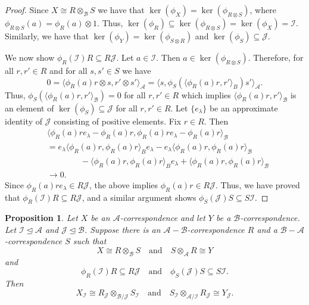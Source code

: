\documentclass[11pt, letterpaper,final]{amsart}
\newcommand{\A}{{\mathcal{A}}}
\newcommand{\B}{{\mathcal{B}}}
\newcommand{\I}{{\mathcal{I}}}
\newcommand{\J}{{\mathcal{J}}}
\newtheorem{prp}[thm]{Proposition}
\theoremstyle{definition}
\begin{document}
\begin{proof}
Since $X \cong R \otimes_{\B} S$ we have that $\ker(\phi_X) = \ker(\phi_{R \otimes S} )$, where $\phi_{R\otimes S}(a) = \phi_{R}(a) \otimes 1$.  Thus, $\ker(\phi_R) \subseteq  \ker(\phi_{R \otimes S} ) = \ker(\phi_X)  =\I$. Similarly, we have that $\ker(\phi_Y) = \ker( \phi_{S\otimes R} )$ and $\ker(\phi_S ) \subseteq \J$.  

We now show $\phi_R(\I)R \subseteq R\J$. Let $a \in \I$.  Then $a \in \ker( \phi_{R \otimes S} )$.  Therefore, for all $r, r' \in R$ and for all $s, s' \in S$ we have
$$
0 = \langle \phi_R(a) r \otimes s , r' \otimes s' \rangle_{\A} = \langle s , \phi_S ( \langle \phi_R(a)r, r' \rangle_B ) s' \rangle_{\A}.
$$
Thus, $\phi_S ( \langle \phi_R(a)r, r' \rangle_{\B} ) = 0$ for all $r, r' \in R$ which implies $\langle \phi_R(a)r, r' \rangle_{\B}$ is an element of $\ker(\phi_S) \subseteq \J$ for all $r, r' \in R$.  Let $\{ e_\lambda \}$ be an approximate identity of $\J$ consisting of positive elements. Fix $r \in R$.  Then
\begin{align*}
&\langle \phi_R(a) r e_\lambda - \phi_R(a)r ,\phi_R(a) r e_\lambda - \phi_R(a)r \rangle_{\B} \\
&= e_\lambda \langle \phi_R(a) r, \phi_R(a) r \rangle_B e_\lambda - e_\lambda \langle \phi_R(a) r, \phi_R(a) r \rangle_{\B} \\
&\qquad \qquad -  \langle \phi_R(a) r, \phi_R(a) r \rangle_B e_\lambda + \langle \phi_R(a) r, \phi_R(a) r \rangle_{\B} \\
&\to 0.
\end{align*}
Since $\phi_R(a) r e_\lambda \in R\J$, the above implies $\phi_R(a) r \in R\J$.  Thus, we have proved that $\phi_R(\I)R \subseteq R\J$, and a similar argument shows $\phi_S(\J) S \subseteq S \I$.
\end{proof}


\begin{prp} \label{p:one-step-quotient}
Let $X$ be an $\A$-correspondence and let $Y$ be a $\B$-correspondence.  Let $\I \unlhd \A$ and $\J \unlhd \B$.  Suppose there is an $\A-\B$-correspondence $R$ and a $\B-\A$-correspondence $S$ such that 
$$X \cong R \otimes_{\B} S \quad \text{and} \quad S \otimes_{\A} R \cong Y$$
and 
$$
\phi_R(\I)R \subseteq R\J \quad \text{and} \quad \phi_S(\J) S \subseteq S\I.
$$
Then 
$$X_{\I} \cong R_{\J} \otimes_{\B/\J} S_{\I} \quad \text{and} \quad S_{\I} \otimes_{\A/\I} R_{\J} \cong Y_{\J}.$$
\end{prp}
\end{document}
